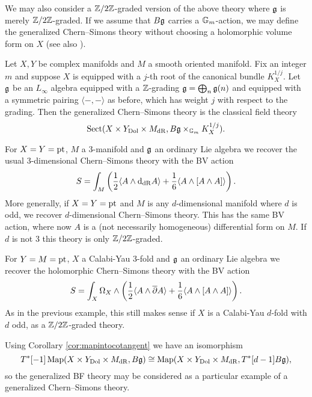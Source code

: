 \documentclass[10pt, oneside]{article}
\begin{document}
We may also consider a $\mathbb Z/2\mathbb Z$-graded version of the above theory where $\mathfrak g$ is merely $\mathbb Z/2\mathbb Z$-graded. If we assume that $B\mathfrak g$ carries a $\mathbb{G}_m$-action, we may define the generalized Chern--Simons theory without choosing a holomorphic volume form on $X$ (see also \cite{GinzburgRozenblyum}).

\begin{definition}
Let $X,Y$ be complex manifolds and $M$ a smooth oriented manifold. Fix an integer $m$ and suppose $X$ is equipped with a $j$-th root of the canonical bundle $K_X^{1/j}$. Let $\mathfrak g$ be an $L_\infty$ algebra equipped with a $\mathbb Z$-grading $\mathfrak g=\bigoplus_n \mathfrak g(n)$ and equipped with a symmetric pairing $\langle -, -\rangle$ as before, which has weight $j$ with respect to the grading. Then the generalized Chern--Simons theory is the classical field theory
\[\mathrm{Sect}(X\times Y_{\mathrm{Dol}}\times M_{\mathrm{dR}}, B\mathfrak g\times_{\mathbb{G}_m} K_X^{1/j}).\]
\label{def:sectChernSimons}
\end{definition}

\begin{example}
For $X=Y=\operatorname{pt}$, $M$ a 3-manifold and $\mathfrak g$ an ordinary Lie algebra we recover the usual 3-dimensional Chern--Simons theory with the BV action
\[S = \int_M \left(\frac{1}{2}\langle A\wedge {\rm d}_{\mathrm{dR}} A\rangle + \frac{1}{6}\langle A\wedge [A\wedge A]\rangle\right).\]
More generally, if $X=Y=\operatorname{pt}$ and $M$ is any $d$-dimensional manifold where $d$ is odd, we recover $d$-dimensional Chern--Simons theory.  This has the same BV action, where now $A$ is a (not necessarily homogeneous) differential form on $M$.  If $d$ is not 3 this theory is only $\mathbb Z/2\mathbb Z$-graded.
\end{example}

\begin{example}
For $Y=M=\operatorname{pt}$, $X$ a Calabi-Yau 3-fold and $\mathfrak g$ an ordinary Lie algebra we recover the holomorphic Chern--Simons theory with the BV action
\[S = \int_X \Omega_X\wedge \left(\frac{1}{2}\langle A\wedge \overline{\partial} A\rangle + \frac{1}{6}\langle A\wedge [A\wedge A]\rangle\right).\]
As in the previous example, this still makes sense if $X$ is a Calabi-Yau $d$-fold with $d$ odd, as a $\mathbb Z/2\mathbb Z$-graded theory.
\end{example}

\begin{example}
Using Corollary \ref{cor:mapintocotangent} we have an isomorphism
\[T^*[-1]\operatorname{Map}(X\times Y_{\mathrm{Dol}}\times M_{\mathrm{dR}}, B\mathfrak g)\cong \operatorname{Map}(X\times Y_{\mathrm{Dol}}\times M_{\mathrm{dR}}, T^*[d-1]B\mathfrak g),\]
so the generalized BF theory may be considered as a particular example of a generalized Chern--Simons theory.
\label{ex:CSBF}
\end{example}
\end{document}

